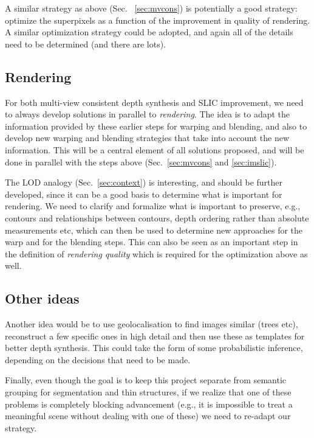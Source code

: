 \documentclass{article}
\begin{document}
A similar strategy as above (Sec. ~\ref{sec:mvcons}) is potentially a good strategy: optimize the superpixels as a function of the improvement in quality of rendering. A similar optimization strategy could be adopted, and again all of the details need to be determined (and there are lots).

\subsection{Rendering}
\label{sec:render}

For both multi-view consistent depth synthesis and SLIC improvement, we need to always develop solutions
in parallel to \emph{rendering}. The idea is to adapt the information provided by these earlier steps
for warping and blending, and also to develop new warping and blending strategies that take
into account the new information. This will be a central element of all solutions proposed,
and will be done in parallel with the steps above (Sec.~\ref{sec:mvcons} and \ref{sec:imslic}).

The LOD analogy (Sec.~\ref{sec:context}) is interesting, and should be further developed, since it can be a good
basis to determine what is important for rendering. We need to clarify and formalize what
is important to preserve, e.g., contours and relationships between contours, depth
ordering rather than absolute measurements etc, which can then be used to determine new
approaches for the warp and for the blending steps.
This can also be seen as an important step in the definition of \emph{rendering quality}
which is required for the optimization above as well.


\subsection{Other ideas}

Another idea would be to use geolocalisation to find images similar (trees etc), reconstruct a few specific ones in high detail and then use these as templates for better depth synthesis. This could take the form of some probabilistic inference, depending on the decisions that need to be made.

Finally, even though the goal is to keep this project separate from semantic grouping for segmentation and thin structures, if we realize that one of these problems is completely blocking advancement (e.g., it is impossible to treat a meaningful scene without  dealing with one of these) we need to re-adapt our strategy.
\end{document}
